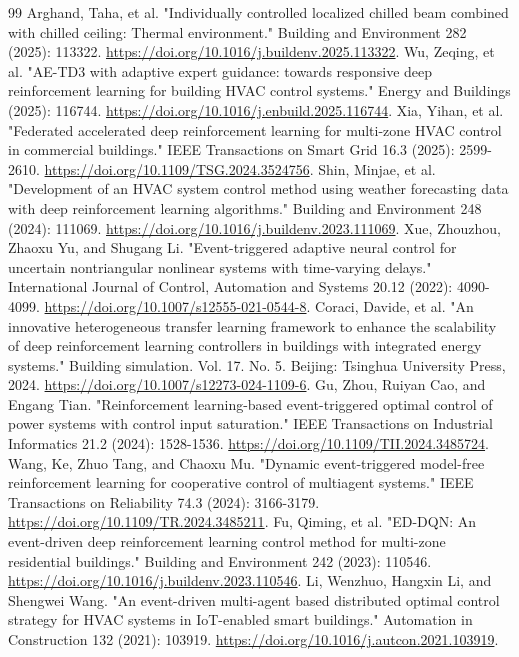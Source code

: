 ﻿\documentclass[preprint,12pt,number]{elsarticle}
\begin{document}
\begin{thebibliography}{99}
 Arghand, Taha, et al. "Individually controlled localized chilled beam combined with chilled ceiling: Thermal environment." Building and Environment 282 (2025): 113322. \url{https://doi.org/10.1016/j.buildenv.2025.113322}.
 Wu, Zeqing, et al. "AE-TD3 with adaptive expert guidance: towards responsive deep reinforcement learning for building HVAC control systems." Energy and Buildings (2025): 116744. \url{https://doi.org/10.1016/j.enbuild.2025.116744}.
 Xia, Yihan, et al. "Federated accelerated deep reinforcement learning for multi-zone HVAC control in commercial buildings." IEEE Transactions on Smart Grid 16.3 (2025): 2599-2610. \url{https://doi.org/10.1109/TSG.2024.3524756}.
 Shin, Minjae, et al. "Development of an HVAC system control method using weather forecasting data with deep reinforcement learning algorithms." Building and Environment 248 (2024): 111069. \url{https://doi.org/10.1016/j.buildenv.2023.111069}.
 Xue, Zhouzhou, Zhaoxu Yu, and Shugang Li. "Event-triggered adaptive neural control for uncertain nontriangular nonlinear systems with time-varying delays." International Journal of Control, Automation and Systems 20.12 (2022): 4090-4099. \url{https://doi.org/10.1007/s12555-021-0544-8}.
 Coraci, Davide, et al. "An innovative heterogeneous transfer learning framework to enhance the scalability of deep reinforcement learning controllers in buildings with integrated energy systems." Building simulation. Vol. 17. No. 5. Beijing: Tsinghua University Press, 2024. \url{https://doi.org/10.1007/s12273-024-1109-6}.
 Gu, Zhou, Ruiyan Cao, and Engang Tian. "Reinforcement learning-based event-triggered optimal control of power systems with control input saturation." IEEE Transactions on Industrial Informatics 21.2 (2024): 1528-1536. \url{https://doi.org/10.1109/TII.2024.3485724}.
 Wang, Ke, Zhuo Tang, and Chaoxu Mu. "Dynamic event-triggered model-free reinforcement learning for cooperative control of multiagent systems." IEEE Transactions on Reliability 74.3 (2024): 3166-3179. \url{https://doi.org/10.1109/TR.2024.3485211}.
 Fu, Qiming, et al. "ED-DQN: An event-driven deep reinforcement learning control method for multi-zone residential buildings." Building and Environment 242 (2023): 110546. \url{https://doi.org/10.1016/j.buildenv.2023.110546}.
 Li, Wenzhuo, Hangxin Li, and Shengwei Wang. "An event-driven multi-agent based distributed optimal control strategy for HVAC systems in IoT-enabled smart buildings." Automation in Construction 132 (2021): 103919. \url{https://doi.org/10.1016/j.autcon.2021.103919}.

\end{thebibliography}
\end{document}
